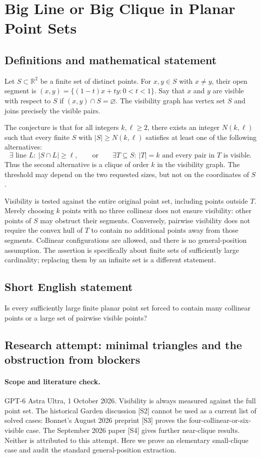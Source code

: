 \documentclass[11pt,a4paper]{article}
\begin{document}
\section*{Big Line or Big Clique in Planar Point Sets}\label{statement}

\subsection{Definitions and mathematical statement}
Let $S\subset\mathbb R^2$ be a finite set of distinct points. For
$x,y\in S$ with $x\ne y$, their open segment is
$(x,y)=\{(1-t)x+ty:0<t<1\}$. Say that $x$ and $y$ are visible with
respect to $S$ if $(x,y)\cap S=\varnothing$. The visibility graph has
vertex set $S$ and joins precisely the visible pairs.

The conjecture is that for all integers $k,\ell\ge2$, there exists an
integer $N(k,\ell)$ such that every finite $S$ with $|S|\ge N(k,\ell)$
satisfies at least one of the following alternatives:
\[
 \exists\text{ line }L:\ |S\cap L|\ge\ell,
 \qquad\text{or}\qquad
 \exists T\subseteq S:\ |T|=k\text{ and every pair in }T\text{ is visible}.
\]
Thus the second alternative is a clique of order $k$ in the visibility
graph. The threshold may depend on the two requested sizes, but not on
the coordinates of $S$.

Visibility is tested against the entire original point set, including
points outside $T$. Merely choosing $k$ points with no three collinear
does not ensure visibility: other points of $S$ may obstruct their
segments. Conversely, pairwise visibility does not require the convex hull
of $T$ to contain no additional points away from those segments.
Collinear configurations are allowed, and there is no general-position
assumption. The assertion is specifically about finite sets of sufficiently
large cardinality; replacing them by an infinite set is a different statement.
\subsection{Short English statement}
Is every sufficiently large finite planar point set forced to contain many collinear points or a large set of pairwise visible points?
\subsection{Research attempt: minimal triangles and the obstruction from blockers}
\paragraph{Scope and literature check.}
GPT-6 Astra Ultra, 1 October 2026. Visibility is always measured
against the full point set. The historical Garden discussion [S2]
cannot be used as a current list of solved cases: Bonnet's August
2026 preprint [S3] proves the four-collinear-or-six-visible case.
The September 2026 paper [S4] gives further near-clique results.
Neither is attributed to this attempt. Here we prove an elementary
small-clique case and audit the standard general-position extraction.
\end{document}
